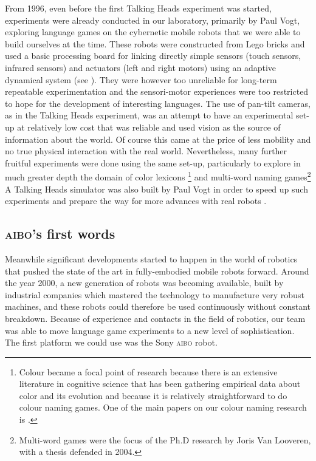 From 1996, even before the first Talking Heads experiment was started, experiments were already conducted in our 
laboratory, primarily by Paul Vogt, exploring language games on the cybernetic mobile robots that we were able to build ourselves
at the time. These robots were constructed from Lego bricks and 
used a basic processing board for linking directly simple sensors (touch sensors, infrared sensors) and actuators (left and right motors)
using an adaptive dynamical system (see ). They were however too unreliable for long-term repeatable 
experimentation and the sensori-motor experiences were too restricted to hope for the development of interesting languages. The use 
of pan-tilt cameras, as in the Talking Heads experiment, was an attempt to 
have an experimental set-up at relatively low cost that was reliable and
used vision as the source of information about the world. Of course this came
at the price of less mobility and no true physical interaction with the real world. Nevertheless, many further fruitful experiments were 
done using the same set-up, particularly to explore in much greater depth the domain of color lexicons
\footnote{Colour became a focal point of research because there is an extensive literature in cognitive science that has 
been gathering empirical data about color and its evolution and because it is relatively straightforward to do 
colour naming games. One of the main papers on our colour naming research is 
\cite{Steels:2005}.} and multi-word naming games\footnote{Multi-word games were the focus of the Ph.D research by 
Joris Van Looveren, with a thesis defended in 2004.}
A Talking Heads simulator was also built by Paul Vogt in 
order to speed up such experiments and prepare the way for more advances with real robots \citep{Vogt:2003}.

\subsection{\textsc{aibo}'s first words}

Meanwhile significant developments started to happen in the world of robotics that pushed the state of 
the art in fully-embodied mobile robots forward.  
Around the year 2000, a new generation of robots was becoming available, built 
by industrial companies which mastered the technology to manufacture very robust machines, and these robots could therefore
be used continuously without constant breakdown. Because of experience and contacts in the field of
robotics, our team was able to move language game experiments to a new level of sophistication. The first 
platform we could use was the Sony \textsc{aibo} robot. 

